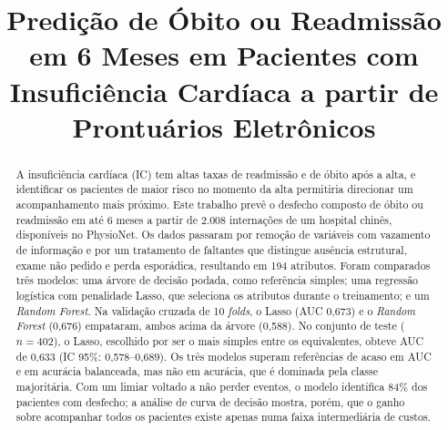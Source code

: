 \documentclass[conference]{IEEEtran}
\begin{document}
\renewcommand{\IEEEkeywordsname}{Palavras-chave}

\title{Predição de Óbito ou Readmissão em 6 Meses em Pacientes com Insuficiência Cardíaca a partir de Prontuários Eletrônicos}

\author{
\and
{}
}

\maketitle

\begin{abstract}
A insuficiência cardíaca (IC) tem altas taxas de readmissão e de óbito após a alta, e identificar os pacientes de maior risco no momento da alta permitiria direcionar um acompanhamento mais próximo. Este trabalho prevê o desfecho composto de óbito ou readmissão em até 6 meses a partir de 2.008 internações de um hospital chinês, disponíveis no PhysioNet. Os dados passaram por remoção de variáveis com vazamento de informação e por um tratamento de faltantes que distingue ausência estrutural, exame não pedido e perda esporádica, resultando em 194 atributos. Foram comparados três modelos: uma árvore de decisão podada, como referência simples; uma regressão logística com penalidade Lasso, que seleciona os atributos durante o treinamento; e um \textit{Random Forest}. Na validação cruzada de 10 \textit{folds}, o Lasso (AUC 0,673) e o \textit{Random Forest} (0,676) empataram, ambos acima da árvore (0,588). No conjunto de teste ($n = 402$), o Lasso, escolhido por ser o mais simples entre os equivalentes, obteve AUC de 0,633 (IC 95\%: 0,578--0,689). Os três modelos superam referências de acaso em AUC e em acurácia balanceada, mas não em acurácia, que é dominada pela classe majoritária. Com um limiar voltado a não perder eventos, o modelo identifica 84\% dos pacientes com desfecho; a análise de curva de decisão mostra, porém, que o ganho sobre acompanhar todos os pacientes existe apenas numa faixa intermediária de custos.
\end{abstract}
\end{document}
